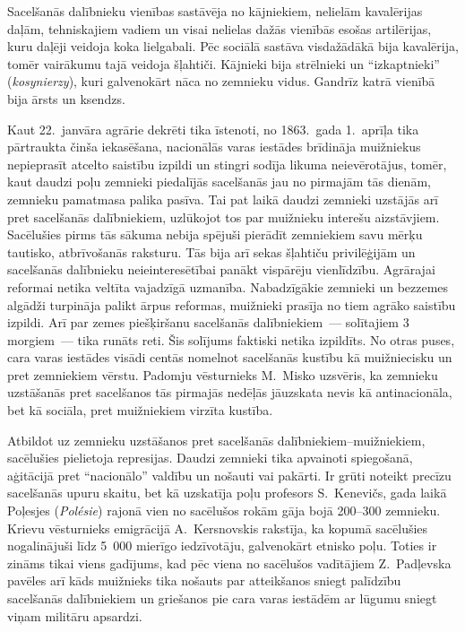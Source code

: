 \documentclass[twoside,a5paper,12pt,fleqn,openany]{extbook}
\newcommand{\pltxti}[1]{\textit{\textpolish{#1}}}
\begin{document}
Sacelšanās dalībnieku vienības sastāvēja no kājniekiem, nelielām kavalērijas daļām, tehniskajiem vadiem un visai nelielas dažās vienībās esošas artilērijas, kuru daļēji veidoja koka lielgabali. Pēc sociālā sastāva visdažādākā bija kavalērija, tomēr vairākumu tajā veidoja šļahtiči. Kājnieki bija strēlnieki un ``izkaptnieki'' (\pltxti{kosynierzy}), kuri galvenokārt nāca no zemnieku vidus. Gandrīz katrā vienībā bija ārsts un ksendzs.

Kaut 22.~janvāra agrārie dekrēti tika īstenoti, no 1863.~gada 1.~aprīļa tika pārtraukta činša iekasēšana, nacionālās varas iestādes brīdināja muižniekus nepieprasīt atcelto saistību izpildi un stingri sodīja likuma neievērotājus, tomēr, kaut daudzi poļu zemnieki piedalījās sacelšanās jau no pirmajām tās dienām, zemnieku pamatmasa palika pasīva. Tai pat laikā daudzi zemnieki uzstājās arī pret sacelšanās dalībniekiem, uzlūkojot tos par muižnieku interešu aizstāvjiem. Sacēlušies pirms tās sākuma nebija spējuši pierādīt zemniekiem savu mērķu tautisko, atbrīvošanās raksturu. Tās bija arī sekas šļahtiču privilēģijām un sacelšanās dalībnieku neieinteresētībai panākt vispārēju vienlīdzību. Agrārajai reformai netika veltīta vajadzīgā uzmanība. Nabadzīgākie zemnieki un bezzemes algādži turpināja palikt ārpus reformas, muižnieki prasīja no tiem agrāko saistību izpildi. Arī par zemes piešķiršanu sacelšanās dalībniekiem~--- solītajiem 3 morgiem~--- tika runāts reti. Šis solījums faktiski netika izpildīts. No otras puses, cara varas iestādes visādi centās nomelnot sacelšanās kustību kā muižniecisku un pret zemniekiem vērstu. Padomju vēsturnieks M.~Misko uzsvēris, ka zemnieku uzstāšanās pret sacelšanos tās pirmajās nedēļās jāuzskata nevis kā antinacionāla, bet kā sociāla, pret muižniekiem virzīta kustība.

Atbildot uz zemnieku uzstāšanos pret sacelšanās dalībniekiem--muižniekiem, sacēlušies pielietoja represijas. Daudzi zemnieki tika apvainoti spiegošanā, aģitācijā pret ``nacionālo'' valdību un nošauti vai pakārti. Ir grūti noteikt precīzu sacelšanās upuru skaitu, bet kā uzskatīja poļu profesors S.~Kenevičs, gada laikā Poļesjes (\pltxti{Polésie}) rajonā vien no sacēlušos rokām gāja bojā 200--300 zemnieku. Krievu vēsturnieks emigrācijā A.~Kersnovskis rakstīja, ka kopumā sacēlušies nogalinājuši līdz 5~000 mierīgo iedzīvotāju, galvenokārt etnisko poļu. Toties ir zināms tikai viens gadījums, kad pēc viena no sacēlušos vadītājiem Z.~Padļevska pavēles arī kāds muižnieks tika nošauts par atteikšanos sniegt palīdzību sacelšanās dalībniekiem un griešanos pie cara varas iestādēm ar lūgumu sniegt viņam militāru apsardzi.
\end{document}
